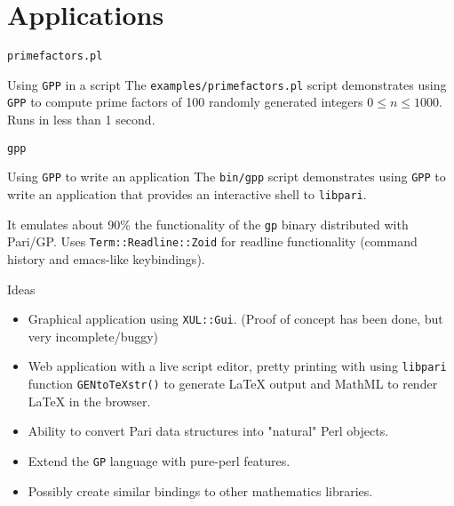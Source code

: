\documentclass{beamer}
\begin{document}
\section{Applications}

\begin{frame}{\texttt{primefactors.pl}}

\begin{block}{Using \texttt{GPP} in a script}
The \texttt{examples/primefactors.pl} script demonstrates using \texttt{GPP} to compute prime factors of 100 randomly generated integers $0 \leq n \leq 1000$. Runs in less than 1 second.
\end{block}

\end{frame}

\begin{frame}{\texttt{gpp}}

\begin{block}{Using \texttt{GPP} to write an application}
The \texttt{bin/gpp} script demonstrates using \texttt{GPP} to write an application that provides an interactive shell to \texttt{libpari}. 

\vspace{1cm}

It emulates about 90\% the functionality of the \texttt{gp} binary distributed with Pari/GP. Uses \texttt{Term::Readline::Zoid} for readline functionality (command history and emacs-like keybindings).
\end{block}

\end{frame}

\begin{frame}{Ideas}
\begin{itemize}
	\item Graphical application using \texttt{XUL::Gui}. (Proof of concept has been done, but very incomplete/buggy)
    \item Web application with a live script editor, pretty printing with using \texttt{libpari} function \texttt{GENtoTeXstr()} to generate \LaTeX{} output and MathML to render \LaTeX{} in the browser.
    \item Ability to convert Pari data structures into "natural" Perl objects.
    \item Extend the \texttt{GP} language with pure-perl features.
    \item Possibly create similar bindings to other mathematics libraries.
\end{itemize}
\end{frame}
\end{document}
